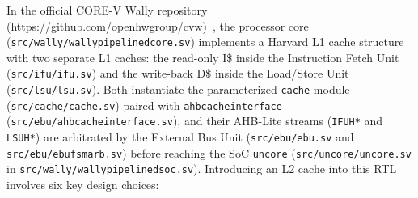 \documentclass[11pt,a4paper]{article}
\begin{document}
In the official CORE-V Wally repository (\url{https://github.com/openhwgroup/cvw})~\cite{wallydoc}, the processor core (\texttt{src/\allowbreak wally/\allowbreak wallypipelinedcore.sv}) implements a Harvard L1 cache structure~\cite{wiki_harvard} with two separate L1 caches: the read-only I\$ inside the Instruction Fetch Unit (\texttt{src/\allowbreak ifu/\allowbreak ifu.sv}) and the write-back D\$ inside the Load/Store Unit (\texttt{src/\allowbreak lsu/\allowbreak lsu.sv}). Both instantiate the parameterized \texttt{cache} module (\texttt{src/\allowbreak cache/\allowbreak cache.sv}) paired with \texttt{ahbcacheinterface} (\texttt{src/\allowbreak ebu/\allowbreak ahbcacheinterface.sv}), and their AHB-Lite streams (\texttt{IFUH*} and \texttt{LSUH*}) are arbitrated by the External Bus Unit (\texttt{src/\allowbreak ebu/\allowbreak ebu.sv} and \texttt{src/\allowbreak ebu/\allowbreak ebufsmarb.sv}) before reaching the SoC \texttt{uncore} (\texttt{src/\allowbreak uncore/\allowbreak uncore.sv} in \texttt{src/\allowbreak wally/\allowbreak wallypipelinedsoc.sv}). Introducing an L2 cache into this RTL involves six key design choices:
\end{document}
